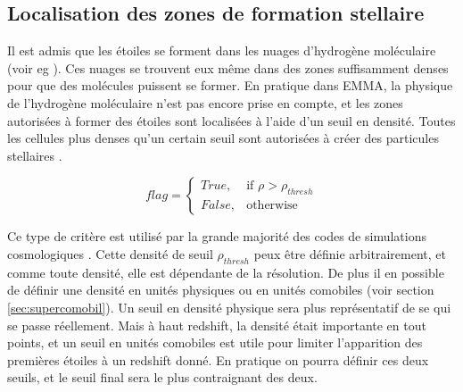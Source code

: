 %




\subsection{Localisation des zones de formation stellaire}

Il est admis que les étoiles se forment dans les nuages d'hydrogène moléculaire (voir eg \cite{krumholz_universal_2012}).
Ces nuages se trouvent eux même dans des zones suffisamment denses pour que des molécules puissent se former.
En pratique dans EMMA, la physique de l'hydrogène moléculaire n'est pas encore prise en compte, et les zones autorisées à former des étoiles sont localisées à l'aide d'un seuil en densité.
Toutes les cellules plus denses qu'un certain seuil sont autorisées à créer des particules stellaires .

\begin{equation}
	flag = 
  \begin{cases}
      True, & \text{if } \rho > \rho_{thresh}\\
      False,              & \text{otherwise}
  \end{cases}
\end{equation} 

Ce type de critère est utilisé par la grande majorité des codes de simulations cosmologiques \citep{kay_including_2002}.
Cette densité de seuil $\rho_{thresh}$ peux être définie arbitrairement, et comme toute densité, elle est dépendante de la résolution.
De plus il en possible de définir une densité en unités physiques ou en unités comobiles (voir section \ref{sec:supercomobil}).
Un seuil en densité physique sera plus représentatif de se qui se passe réellement.
Mais à haut redshift, la densité était importante en tout points, et un seuil en unités comobiles est utile pour limiter l'apparition des premières étoiles à un redshift donné.
En pratique on pourra définir ces deux seuils, et le seuil final sera le plus contraignant des deux.

